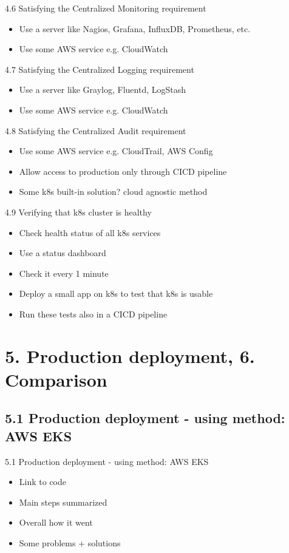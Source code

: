 \documentclass{beamer}
\begin{document}
\begin{frame}{4.6 Satisfying the Centralized Monitoring  requirement}%
\begin{itemize}
	\item Use a server like Nagios, Grafana, InfluxDB, Prometheus, etc.
	\item Use some AWS service e.g. CloudWatch
\end{itemize}
\end{frame}

\begin{frame}{4.7 Satisfying the Centralized Logging  requirement}%
\begin{itemize}
	\item Use a server like Graylog, Fluentd, LogStash
	\item Use some AWS service e.g. CloudWatch
\end{itemize}
\end{frame}

\begin{frame}{4.8 Satisfying the Centralized Audit requirement}%
\begin{itemize}
	\item Use some AWS service e.g. CloudTrail, AWS Config
	\item Allow access to production only through CICD pipeline
	\item Some k8s built-in solution? cloud agnostic method
\end{itemize}
\end{frame}

\begin{frame}{4.9 Verifying that k8s cluster is healthy}%
\begin{itemize}
	\item Check health status of all k8s services
	\item Use a status dashboard
	\item Check it every 1 minute
	\item Deploy a small app on k8s to test that k8s is usable
	\item Run these tests also in a CICD pipeline
\end{itemize}
\end{frame}

\section{5. Production deployment, 6. Comparison}
\subsection{5.1 Production deployment - using method: AWS EKS}
\begin{frame}{5.1 Production deployment - using method: AWS EKS}%
\begin{itemize}
	\item Link to code
	\item Main steps summarized
	\item Overall how it went
	\item Some problems + solutions 
\end{itemize}
\end{frame}
\end{document}
